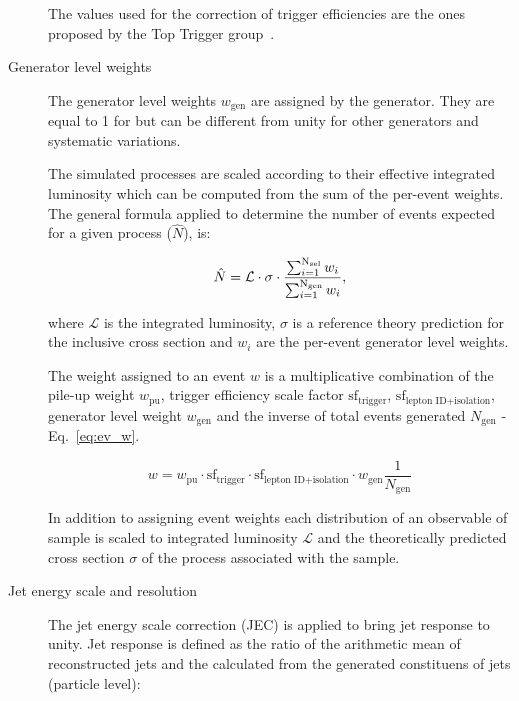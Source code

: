 \begin{description}
The values used for the correction of trigger efficiencies are the ones proposed by the Top Trigger group~\cite{twiki:toptrig}.

\item[Generator level weights]

The generator level weights $w_{\text{gen}}$ are assigned by the generator. They are equal to 1 for \POWHEG but can be different from unity for other generators and systematic variations.

The simulated processes are scaled according to their effective integrated luminosity which can be computed from the sum of the per-event weights. The general formula applied to determine the number of events expected for a given process ($\hat{N}$), is:

\begin{equation}
\hat{N}=\mathcal{L}\cdot\sigma\cdot\frac{\sum_{i=1}^{\rm N_{sel}} w_i}{\sum_{i=1}^{\rm N_{gen}} w_i},
\label{eq:genwgts}
\end{equation}

where $\mathcal{L}$ is the integrated luminosity, $\sigma$ is a reference theory prediction for the inclusive cross section and $w_i$ are the per-event generator level weights.

The weight assigned to an event $w$ is a multiplicative combination of the pile-up weight $w_{\text{pu}}$, trigger efficiency scale factor $\text{sf}_{\text{trigger}}$, $\text{sf}_{\text{lepton\ ID+isolation}}$, generator level weight $w_{\text{gen}}$ and the inverse of total events generated $N_{\text{gen}}$ - Eq.~\ref{eq:ev_w}. 

\begin{equation}
w=w_{\text{pu}}\cdot\text{sf}_{\text{trigger}}\cdot\text{sf}_{\text{lepton\ ID+isolation}}\cdot w_{\text{gen}}\frac{1}{N_{\text{gen}}}
\label{eq:ev_w}
\end{equation}

In addition to assigning event weights each distribution of an observable of sample is scaled to integrated luminosity $\mathcal{L}$ and the theoretically predicted cross section $\sigma$ of the process associated with the sample. 

\item[Jet energy scale and resolution]
  The jet energy scale correction (JEC) is applied to bring jet response to unity. Jet response \JetResponse is defined as the ratio of the arithmetic mean of reconstructed jets \pt and the \pt calculated from the generated constituens of jets (particle level): 
  

\end{description}
